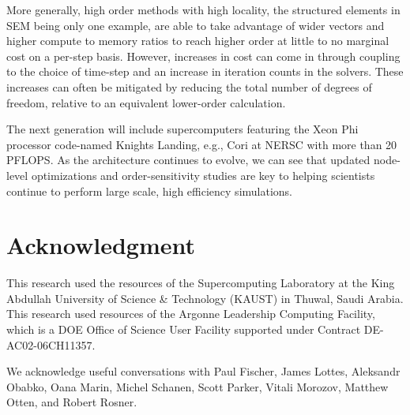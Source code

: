 More generally, high order methods with high locality, the structured elements in SEM being only one example, are able to take advantage of wider vectors and higher compute to memory ratios to reach higher order at little to no marginal cost on a per-step basis.
However, increases in cost can come in through coupling to the choice of time-step and an increase in iteration counts in the solvers.
These increases can often be mitigated by reducing the total number of degrees of freedom, relative to an equivalent lower-order calculation.

The next generation will include supercomputers featuring the Xeon Phi processor code-named Knights Landing, e.g., Cori at NERSC with more than 20 PFLOPS.
As the architecture continues to evolve, we can see that updated node-level optimizations and order-sensitivity studies are key to helping scientists continue to perform large scale, high efficiency simulations. 

\section*{Acknowledgment}

This research used the resources of the Supercomputing Laboratory at the King Abdullah University of Science \& Technology (KAUST) in Thuwal, Saudi Arabia.
This research used resources of the Argonne Leadership Computing Facility, which is a DOE Office of Science User Facility supported under Contract DE-AC02-06CH11357.

We acknowledge useful conversations with
Paul Fischer, 
James Lottes,
Aleksandr Obabko,
Oana Marin,
Michel Schanen,
Scott Parker,
Vitali Morozov,
Matthew Otten,
and Robert Rosner.

